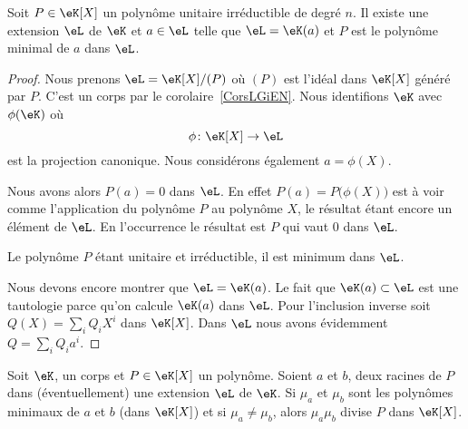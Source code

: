 \begin{lemma}
	Soit \( P\in\eK[X]\) un polynôme unitaire irréductible de degré \( n\). Il existe une extension \( \eL\) de \( \eK\) et \( a\in \eL\) telle que \( \eL=\eK(a)\) et \( P\) est le polynôme minimal de \( a\) dans \( \eL\).
\end{lemma}

\begin{proof}
	Nous prenons \( \eL=\eK[X]/(P)\) où \( (P)\) est l'idéal dans \( \eK[X]\) généré par \( P\). C'est un corps par le corolaire~\ref{CorsLGiEN}. Nous identifions \( \eK\) avec \( \phi(\eK)\) où
	\begin{equation}
		\phi\colon \eK[X]\to \eL
	\end{equation}
	est la projection canonique. Nous considérons également \( a=\phi(X)\).

	Nous avons alors \( P(a)=0\) dans \( \eL\). En effet \( P(a)=P\big( \phi(X) \big)\) est à voir comme l'application du polynôme \( P\) au polynôme \( X\), le résultat étant encore un élément de \( \eL\). En l'occurrence le résultat est \( P\) qui vaut \( 0\) dans \( \eL\).

	Le polynôme \( P\) étant unitaire et irréductible, il est minimum dans \( \eL\).

	Nous devons encore montrer que \( \eL=\eK(a)\). Le fait que \( \eK(a)\subset \eL\) est une tautologie parce qu'on calcule \( \eK(a)\) dans \( \eL\). Pour l'inclusion inverse soit \( Q(X)=\sum_iQ_iX^i\) dans \( \eK[X]\). Dans \( \eL\) nous avons évidemment \( Q=\sum_iQ_ia^i\).
\end{proof}

\begin{proposition} \label{PropyMTEbH}
	Soit \( \eK\), un corps et \( P\in \eK[X]\) un polynôme. Soient \( a\) et \( b\), deux racines de \( P\) dans (éventuellement) une extension \( \eL\) de \( \eK\). Si \( \mu_a\) et \( \mu_b\) sont les polynômes minimaux de \( a\) et \( b\) (dans \( \eK[X]\)) et si \( \mu_a\neq \mu_b\), alors \( \mu_a\mu_b\) divise \( P\) dans \( \eK[X]\).
\end{proposition}

